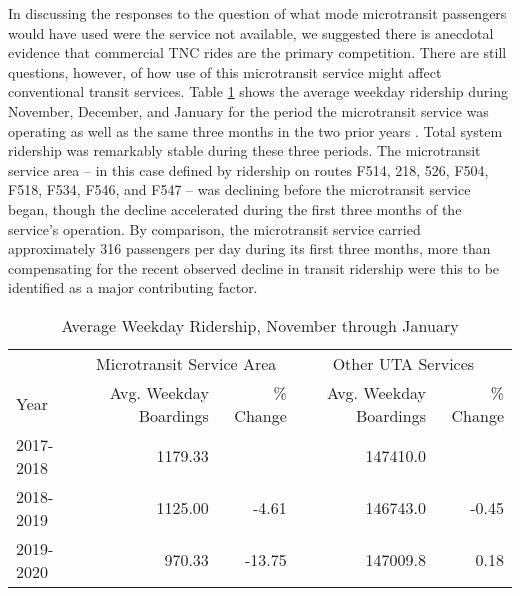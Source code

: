 \documentclass[smartcities,article,submit,moreauthors,pdftex]{Definitions/mdpi}
\begin{document}
In discussing the responses to the question of what mode microtransit passengers would have used were the service not available, we suggested there is anecdotal evidence that commercial TNC rides are the primary competition. There are still questions, however, of how use of this microtransit service might affect conventional transit services. Table \ref{tab:uta-ridership} shows the average weekday ridership during November, December, and January for the period the microtransit service was operating as well as the same three months in the two prior years \citep{uta2020boardings}. Total system ridership was remarkably stable during these three periods. The microtransit service area -- in this case defined by ridership on routes F514, 218, 526, F504, F518, F534, F546, and F547 -- was declining before the microtransit service began, though the decline accelerated during the first three months of the service’s operation. By comparison, the microtransit service carried approximately 316 passengers per day during its first three months, more than compensating for the recent observed decline in transit ridership were this to be identified as a major contributing factor.


\begin{table}[ht]
    \centering
    \caption{Average Weekday Ridership, November through January}
    \label{tab:uta-ridership}
    \begin{tabular}[t]{lrrrr}
\toprule
\multicolumn{1}{c}{ } & \multicolumn{2}{c}{Microtransit Service Area} & \multicolumn{2}{c}{Other UTA Services} \\
\cmidrule(l{3pt}r{3pt}){2-3} \cmidrule(l{3pt}r{3pt}){4-5}
Year & Avg. Weekday Boardings & \% Change & Avg. Weekday Boardings & \% Change\\
\midrule
2017-2018 & 1179.33 &  & 147410.0 & \\
2018-2019 & 1125.00 & -4.61 & 146743.0 & -0.45\\
2019-2020 & 970.33 & -13.75 & 147009.8 & 0.18\\
\bottomrule
\end{tabular}
\end{table}
\end{document}
